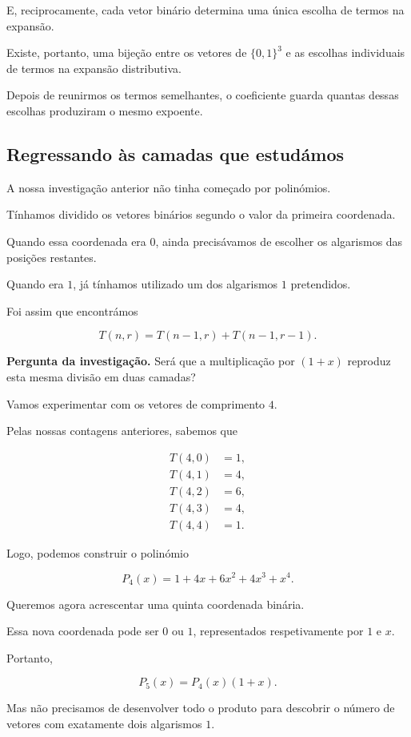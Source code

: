 \documentclass[11pt,a4paper,oneside]{book}
\newcommand{\Pergunta}[1]{\begin{perguntabox}\textbf{Pergunta da investigação.} #1\end{perguntabox}}
\begin{document}
E, reciprocamente, cada vetor binário
determina uma única escolha de termos
na expansão.

Existe, portanto, uma bijeção entre
os vetores de $\{0,1\}^3$ e as
escolhas individuais de termos na
expansão distributiva.

Depois de reunirmos os termos semelhantes,
o coeficiente guarda quantas dessas
escolhas produziram o mesmo expoente.

\subsection*{Regressando às camadas que estudámos}

A nossa investigação anterior não tinha
começado por polinómios.

Tínhamos dividido os vetores binários
segundo o valor da primeira coordenada.

Quando essa coordenada era $0$, ainda
precisávamos de escolher os algarismos
das posições restantes.

Quando era $1$, já tínhamos utilizado
um dos algarismos $1$ pretendidos.

Foi assim que encontrámos

\[
T(n,r)=T(n-1,r)+T(n-1,r-1).
\]

\Pergunta{Será que a multiplicação por
$(1+x)$ reproduz esta mesma divisão
em duas camadas?}

Vamos experimentar com os vetores de
comprimento $4$.

Pelas nossas contagens anteriores,
sabemos que

\[
\begin{aligned}
T(4,0)&=1,\\
T(4,1)&=4,\\
T(4,2)&=6,\\
T(4,3)&=4,\\
T(4,4)&=1.
\end{aligned}
\]

Logo, podemos construir o polinómio

\[
P_4(x)=1+4x+6x^2+4x^3+x^4.
\]

Queremos agora acrescentar uma quinta
coordenada binária.

Essa nova coordenada pode ser $0$ ou $1$,
representados respetivamente por $1$ e $x$.

Portanto,

\[
P_5(x)=P_4(x)(1+x).
\]

Mas não precisamos de desenvolver todo
o produto para descobrir o número de
vetores com exatamente dois algarismos $1$.
\end{document}
